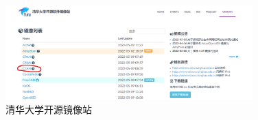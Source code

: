 \begin{figure}[htbp] 
	\centering
	\includegraphics[width=0.85\textwidth]{image/chap01/tsinghua.png}
	\caption{清华大学开源镜像站}
	\label{fig:tsinghua}
\end{figure}